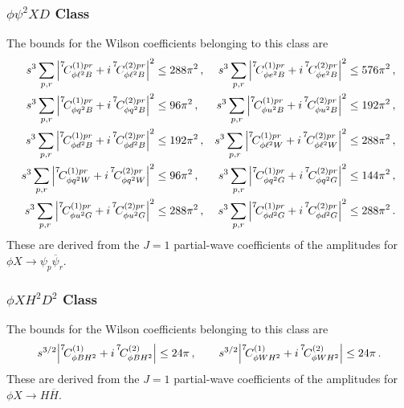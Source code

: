 \subsubsection{$\phi \psi^2 X D$ Class\label{par:phipsi2XD}}

The bounds for the Wilson coefficients belonging to this class are
%
\begin{align}
    s^{3} \sum_{p,r} \abs{\coef{7}{\phi \ell^2 B}{(1)pr}+ i \,\coef{7}{\phi \ell^2 B}{(2)pr}}^2 &\le 288\pi^2\,,
     &
    s^{3} \sum_{p,r} \abs{\coef{7}{\phi e^2 B}{(1)pr}+ i \,\coef{7}{\phi e^2 B}{(2)pr}}^2 &\le 576\pi^2\,,    
    \\
    s^{3} \sum_{p,r} \abs{\coef{7}{\phi q^2 B}{(1)pr}+ i \,\coef{7}{\phi q^2 B}{(2)pr}}^2 &\le 96 \pi^2\,,
    &
    s^{3} \sum_{p,r} \abs{\coef{7}{\phi u^2 B}{(1)pr}+ i \,\coef{7}{\phi u^2 B}{(2)pr}}^2 &\le 192 \pi^2\,,
    \\
    s^{3} \sum_{p,r} \abs{\coef{7}{\phi d^2 B}{(1)pr}+ i \,\coef{7}{\phi d^2 B}{(2)pr}}^2 &\le 192 \pi^2\,,
    &
    s^{3} \sum_{p,r} \abs{\coef{7}{\phi \ell^2 W}{(1)pr}+ i \,\coef{7}{\phi \ell^2 W}{(2)pr}}^2 &\le 288\pi^2\,,
    \\
    s^{3} \sum_{p,r} \abs{\coef{7}{\phi q^2 W}{(1)pr}+ i \,\coef{7}{\phi q^2 W}{(2)pr}}^2 &\le 96 \pi^2\,,
    &
    s^{3} \sum_{p,r} \abs{\coef{7}{\phi q^2 G}{(1)pr}+ i \,\coef{7}{\phi q^2 G}{(2)pr}}^2 &\le 144 \pi^2\,, 
    \\
    s^{3} \sum_{p,r} \abs{\coef{7}{\phi u^2 G}{(1)pr}+ i \,\coef{7}{\phi u^2 G}{(2)pr}}^2 &\le 288 \pi^2\,,
    & 
    s^{3} \sum_{p,r} \abs{\coef{7}{\phi d^2 G}{(1)pr}+ i \,\coef{7}{\phi d^2 G}{(2)pr}}^2 &\le 288 \pi^2\,.
\end{align}
These are derived from the $J=1$ partial-wave coefficients of the amplitudes for $\phi X \to \psi_p \overline \psi_r$.

\subsubsection{$\phi X H^2 D^2$ Class\label{par:phiXH2D2}}

The bounds for the Wilson coefficients belonging to this class are
\begin{equation}
s^{3/2}\abs{\coef{7}{\phi B H^2}{(1)}+ i \,\coef{7}{\phi B H^2}{(2)}} \le 24\pi\,,
\qquad
s^{3/2}\abs{\coef{7}{\phi W H^2}{(1)}+ i \,\coef{7}{\phi W H^2}{(2)}} \le 24\pi\,.
\end{equation}
These are derived from the $J=1$ partial-wave coefficients of the amplitudes for $\phi X \to H \overline H$.


